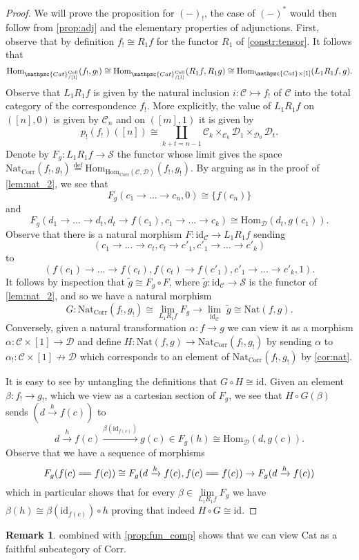 \documentclass[a4paper, reqno]{amsart}
\theoremstyle{definition}
\newtheorem{remark}[theorem]{Remark}
\newcommand\cC{\mathscr C}
\newcommand\cD{\mathscr D}
\newcommand\cS{\mathscr S}
\newcommand\id{\mathrm{id}}
\newcommand\mor{\mathrm{Hom}}
\newcommand\nat{\mathrm{Nat}}
\newcommand\cat{\mathrm{Cat}}
\newcommand\ccat{\mathpzc{Cat}}
\newcommand\bydef{\overset{\mathrm{def}}{=}}
\newcommand\corr{\mathrm{Corr}}
\newcommand\cell{\mathrm{Cell}}
\begin{document}
\begin{proof}
We will prove the proposition for $(-)_!$, the case of $(-)^*$ would then follow from \cref{prop:adj} and the elementary properties of adjunctions. First, observe that by definition $f_!\cong R_1f$ for the functor $R_1$ of \cref{constr:tensor}. It follows that
\[\mor_{\ccat^\cell_{/[1]}}(f_!,g_!)\cong \mor_{\ccat^\cell_{/[1]}}(R_1 f,R_1 g)\cong \mor_{\ccat\times [1]}(L_1 R_1 f,g).\]
Observe that $L_1 R_1 f$ is given by the natural inclusion $i:\cC\rightarrowtail f_!$ of $\cC$ into the total category of the correspondence $f_!$. More explicitly, the value of $L_1 R_1 f$ on $([n],0)$ is given by $\cC_n$ and on $([m],1)$ it is given by \[p_!(f_!)([n])\cong \coprod_{k+t=n-1} \cC_k\times_{\cC_0}\cD_1\times_{\cD_0}\cD_t.\] Denote by $F_g:L_1 R_1 f\rightarrow\cS$ the functor whose limit gives the space $\nat_\corr(f_!,g_!)\bydef \mor_{\mor_{\mathrm{Corr}}(\cC,\cD)}(f_!,g_!)$. By arguing as in the proof of \cref{lem:nat_2}, we see that 
\[F_g(c_1\rightarrow...\rightarrow c_n,0)\cong \{f(c_n)\}\]
and 
\[F_g(d_1\rightarrow...\rightarrow d_t, d_t\rightarrow f(c_1), c_1\rightarrow...\rightarrow c_k)\cong \mor_\cD(d_t, g(c_1)).\] 
Observe that there is a natural morphism $F:\id_\cC\rightarrow L_1 R_1 f$ sending \[(c_1\rightarrow...\rightarrow c_t, c_t\rightarrow c'_1, c'_1\rightarrow...\rightarrow c'_k)\]
to 
\[(f(c_1)\rightarrow...\rightarrow f(c_t), f(c_t)\rightarrow f(c'_1), c'_1\rightarrow...\rightarrow c'_k,1).\] 
It follows by inspection that $\widetilde{g}\cong F_g\circ F$, where $\widetilde{g}:\id_\cC\rightarrow\cS$ is the functor of \cref{lem:nat_2}, and so we have a natural morphism 
\[G:\nat_\corr(f_!,g_!)\cong \underset{L_1 R_1 f}{\lim}F_g\rightarrow\underset{\id_\cC}{\lim}\;\widetilde{g}\cong \nat(f,g).\]
Conversely, given a natural transformation $\alpha:f\rightarrow g$ we can view it as a morphism $\alpha:\cC\times[1]\rightarrow\cD$ and define $H:\nat(f,g)\rightarrow\nat_\corr(f_!,g_!)$ by sending $\alpha$ to $\alpha_!:\cC\times[1]\nrightarrow\cD$ which corresponds to an element of $\nat_\corr(f_!,g_!)$ by \cref{cor:nat}.\par
It is easy to see by untangling the definitions that $G\circ H\cong \id$. Given an element $\beta:f_!\rightarrow g_!$, which we view as a cartesian section of $F_g$, we see that $H\circ G (\beta)$ sends $(d\xrightarrow{h}f(c))$ to 
\[d\xrightarrow{h}f(c)\xrightarrow{\beta(\id_{f(c)})}g(c)\in F_g(h)\cong\mor_{\cD}(d, g(c)).\]
Observe that we have a sequence of morphisms 
\[F_g(f(c)=\joinrel= f(c))\cong F_g(d\xrightarrow{h} f(c),f(c)=\joinrel=f(c))\rightarrow F_g(d\xrightarrow{h} f(c))\]
which in particular shows that for every $\beta\in\underset{L_1 R_1 f}{\lim}F_g$ we have $\beta(h)\cong \beta(\id_{f(c)})\circ h$ proving that indeed $H\circ G\cong \id$.
\end{proof}
\begin{remark}\label{rem:subcat}
 combined with \cref{prop:fun_comp} shows that we can view $\cat$ as a faithful subcategory of $\corr$.
\end{remark}
\end{document}
